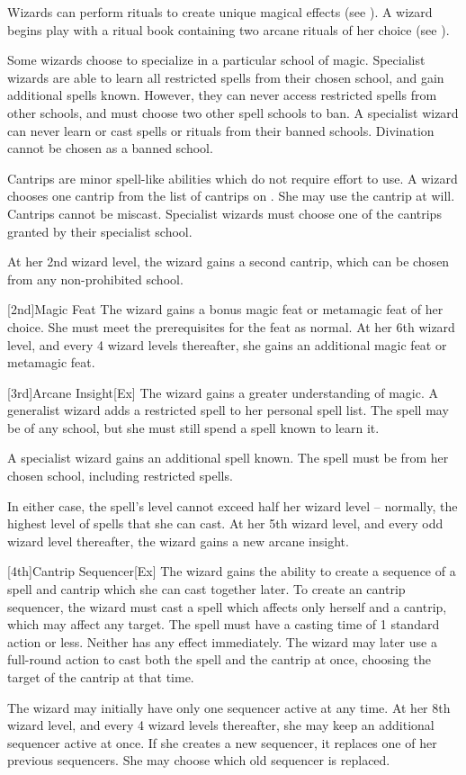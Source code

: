 Wizards can perform rituals to create unique magical effects (see ).
A wizard begins play with a ritual book containing two arcane rituals of her choice (see ).

Some wizards choose to specialize in a particular school of magic.
Specialist wizards are able to learn all restricted spells from their chosen school, and gain additional spells known.
However, they can never access restricted spells from other schools, and must choose two other spell schools to ban.
A specialist wizard can never learn or cast spells or rituals from their banned schools.
Divination cannot be chosen as a banned school.

Cantrips are minor spell-like abilities which do not require effort to use.
A wizard chooses one cantrip from the list of cantrips on .
She may use the cantrip at will.
Cantrips cannot be miscast.
Specialist wizards must choose one of the cantrips granted by their specialist school.

At her 2nd wizard level, the wizard gains a second cantrip, which can be chosen from any non-prohibited school.

[2nd]{Magic Feat}
The wizard gains a bonus magic feat or metamagic feat of her choice.
She must meet the prerequisites for the feat as normal.
At her 6th wizard level, and every 4 wizard levels thereafter, she gains an additional magic feat or metamagic feat.

[3rd]{Arcane Insight}[Ex]
The wizard gains a greater understanding of magic.
A generalist wizard adds a restricted spell to her personal spell list.
The spell may be of any school, but she must still spend a spell known to learn it.

A specialist wizard gains an additional spell known.
The spell must be from her chosen school, including restricted spells.

In either case, the spell's level cannot exceed half her wizard level -- normally, the highest level of spells that she can cast.
At her 5th wizard level, and every odd wizard level thereafter, the wizard gains a new arcane insight.

[4th]{Cantrip Sequencer}[Ex]
The wizard gains the ability to create a sequence of a spell and cantrip which she can cast together later.
To create an cantrip sequencer, the wizard must cast a spell which affects only herself and a cantrip, which may affect any target.
The spell must have a casting time of 1 standard action or less.
Neither has any effect immediately.
The wizard may later use a full-round action to cast both the spell and the cantrip at once, choosing the target of the cantrip at that time.
\par The wizard may initially have only one sequencer active at any time.
At her 8th wizard level, and every 4 wizard levels thereafter, she may keep an additional sequencer active at once.
If she creates a new sequencer, it replaces one of her previous sequencers.
She may choose which old sequencer is replaced.

